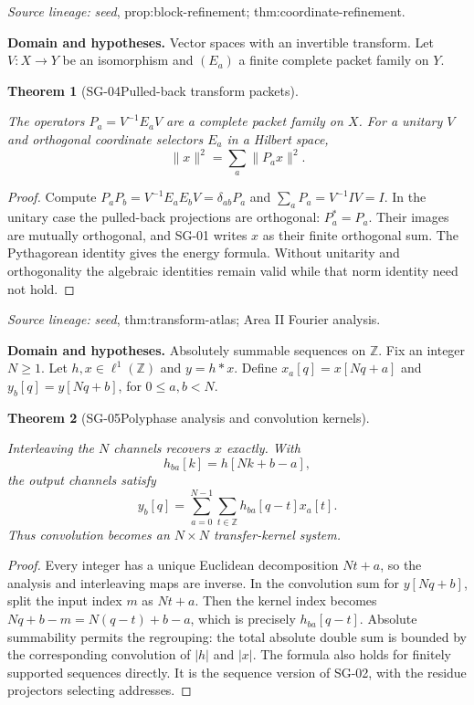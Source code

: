 \documentclass[11pt]{article}
\newtheorem{theorem}{Theorem}[section]
\theoremstyle{definition}\newtheorem{definition}[theorem]{Definition}
\theoremstyle{remark}\newtheorem{remark}[theorem]{Remark}
\begin{document}
\par{\small\color{Teal}\textit{Source lineage:} \textit{seed}, prop:block-refinement; thm:coordinate-refinement.}\par

\par{\small\textbf{Domain and hypotheses.} Vector spaces with an invertible transform. Let $V:X\to Y$ be an isomorphism and $(E_a)$ a finite complete packet family on $Y$.}\par
\begin{theorem}[SG-04\quad Pulled-back transform packets]\label{SG-04}

The operators $P_a=V^{-1}E_aV$ are a complete packet family on $X$.
For a unitary $V$ and orthogonal coordinate selectors $E_a$ in a Hilbert space,
\[
 \|x\|^2=\sum_a\|P_ax\|^2.
\]

\end{theorem}
\begin{proof}

Compute $P_aP_b=V^{-1}E_aE_bV=\delta_{ab}P_a$ and
$\sum_aP_a=V^{-1}IV=I$. In the unitary case the pulled-back projections are
orthogonal: $P_a^*=P_a$. Their images are mutually orthogonal, and SG-01
writes $x$ as their finite orthogonal sum. The Pythagorean identity gives the
energy formula. Without unitarity and orthogonality the algebraic identities
remain valid while that norm identity need not hold.

\end{proof}

\par{\small\color{Teal}\textit{Source lineage:} \textit{seed}, thm:transform-atlas; Area II Fourier analysis.}\par

\par{\small\textbf{Domain and hypotheses.} Absolutely summable sequences on $\mathbb Z$. Fix an integer $N\ge1$. Let $h,x\in\ell^1(\mathbb Z)$ and $y=h*x$. Define $x_a[q]=x[Nq+a]$ and $y_b[q]=y[Nq+b]$, for $0\le a,b<N$.}\par
\begin{theorem}[SG-05\quad Polyphase analysis and convolution kernels]\label{SG-05}

Interleaving the $N$ channels recovers $x$ exactly. With
\[
 h_{ba}[k]=h[Nk+b-a],
\]
the output channels satisfy
\[
 y_b[q]=\sum_{a=0}^{N-1}\sum_{t\in\mathbb Z}h_{ba}[q-t]x_a[t].
\]
Thus convolution becomes an $N\times N$ transfer-kernel system.

\end{theorem}
\begin{proof}

Every integer has a unique Euclidean decomposition $Nt+a$, so the analysis
and interleaving maps are inverse. In the convolution sum for $y[Nq+b]$, split
the input index $m$ as $Nt+a$. Then the kernel index becomes
$Nq+b-m=N(q-t)+b-a$, which is precisely $h_{ba}[q-t]$.
Absolute summability permits the regrouping: the total absolute double sum
is bounded by the corresponding convolution of $|h|$ and $|x|$.
The formula also holds for finitely supported sequences directly. It is the
sequence version of SG-02, with the residue projectors selecting addresses.

\end{proof}
\end{document}
